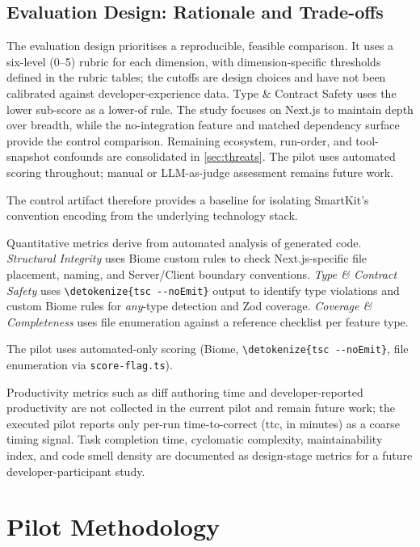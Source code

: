 \documentclass[12pt,a4paper]{report}
\newcommand{\code}[1]{\texttt{\nolinkurl{\detokenize{#1}}}}
\DeclareRobustCommand{\filename}[1]{\bgroup\urlstyle{tt}\nolinkurl{#1}\egroup}
\begin{document}
\subsection{Evaluation Design: Rationale and Trade-offs}
\label{sec:design-rationale}

The evaluation design prioritises a reproducible, feasible comparison. It uses a six-level (0--5) rubric for each dimension, with dimension-specific thresholds defined in the rubric tables; the cutoffs are design choices and have not been calibrated against developer-experience data. Type \& Contract Safety uses the lower sub-score as a lower-of rule. The study focuses on Next.js to maintain depth over breadth, while the no-integration feature and matched dependency surface provide the control comparison. Remaining ecosystem, run-order, and tool-snapshot confounds are consolidated in \autoref{sec:threats}. The pilot uses automated scoring throughout; manual or LLM-as-judge assessment remains future work.

The control artifact therefore provides a baseline for isolating SmartKit's convention encoding from the underlying technology stack.

Quantitative metrics derive from automated analysis of generated code. \textit{Structural Integrity} uses Biome custom rules to check Next.js-specific file placement, naming, and Server/Client boundary conventions. \textit{Type \& Contract Safety} uses \code{tsc --noEmit} output to identify type violations and custom Biome rules for \emph{any}-type detection and Zod coverage. \textit{Coverage \& Completeness} uses file enumeration against a reference checklist per feature type.

The pilot uses automated-only scoring (Biome, \code{tsc --noEmit}, file enumeration via \filename{score-flag.ts}).

Productivity metrics such as diff authoring time and developer-reported productivity \parencite{beller2026dat} are not collected in the current pilot and remain future work; the executed pilot reports only per-run time-to-correct (ttc, in minutes) as a coarse timing signal. Task completion time, cyclomatic complexity, maintainability index, and code smell density are documented as design-stage metrics for a future developer-participant study.

\section{Pilot Methodology}
\label{sec:pilot}
\label{sec:pilot-protocol}
\end{document}
